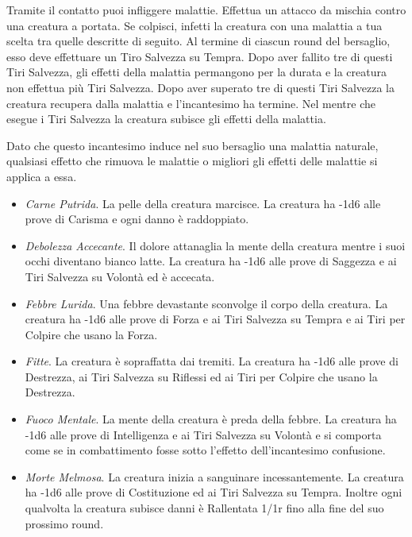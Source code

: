 \begin{multicols}{2}
Tramite il contatto puoi infliggere malattie. Effettua un attacco da mischia contro una creatura a portata. Se colpisci, infetti la creatura con una malattia a tua scelta tra quelle descritte di seguito. Al termine di ciascun round del bersaglio, esso deve effettuare un Tiro Salvezza su Tempra. Dopo aver fallito tre di questi Tiri Salvezza, gli effetti della malattia permangono per la durata e la creatura non effettua più Tiri Salvezza. Dopo aver superato tre di questi Tiri Salvezza la creatura recupera dalla malattia e l'incantesimo ha termine. Nel mentre che esegue i Tiri Salvezza la creatura subisce gli effetti della malattia.

Dato che questo incantesimo induce nel suo bersaglio una malattia naturale, qualsiasi effetto che rimuova le malattie o migliori gli effetti delle malattie si applica a essa.

\begin{itemize}[leftmargin=*] \setlength{\itemsep}{0pt}
	\item \emph{Carne Putrida}. La pelle della creatura marcisce. La creatura ha -1d6 alle prove di Carisma e ogni danno è raddoppiato.
	\item \emph{Debolezza Accecante}. Il dolore attanaglia la mente della creatura mentre i suoi occhi diventano bianco latte. La creatura ha -1d6 alle prove di Saggezza e ai Tiri Salvezza su Volontà ed è accecata.
	\item \emph{Febbre Lurida}. Una febbre devastante sconvolge il corpo della creatura. La creatura ha -1d6 alle prove di Forza e ai Tiri Salvezza su Tempra e ai Tiri per Colpire che usano la Forza.
	\item \emph{Fitte}. La creatura è sopraffatta dai tremiti. La creatura ha -1d6 alle prove di Destrezza, ai Tiri Salvezza su Riflessi ed ai Tiri per Colpire che usano la Destrezza.
	\item \emph{Fuoco Mentale}. La mente della creatura è preda della febbre. La creatura ha -1d6 alle prove di Intelligenza e ai Tiri Salvezza su Volontà e si comporta come se in combattimento fosse sotto l'effetto dell'incantesimo confusione.
	\item \emph{Morte Melmosa}. La creatura inizia a sanguinare incessantemente. La creatura ha -1d6 alle prove di Costituzione ed ai Tiri Salvezza su Tempra. Inoltre ogni qualvolta la creatura subisce danni è Rallentata 1/1r fino alla fine del suo prossimo round.
\end{itemize}


\end{multicols}
